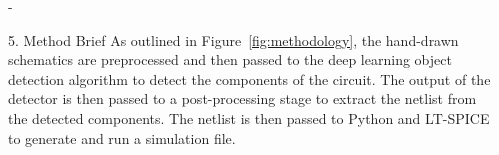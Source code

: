 \documentclass{beamer}
\begin{document}
\begin{frame}[t]
\begin{columns}[t]
\begin{column}{\colwidth}
      {\beamerblocknoheader
        \begin{alertblock}{}
          \centering
          \begin{column}{\colwidth-\sepwidth}
            {\beamerblockheader
              \RaggedRight

              \begin{block}{5. Method Brief}
                As outlined in Figure~\ref{fig:methodology}, the hand-drawn schematics are preprocessed
                and then passed to the deep learning object detection algorithm to detect the components
                of the circuit. The output of the detector is then passed to a post-processing stage to
                extract the netlist from the detected components. The netlist is then passed to Python
                and LT-SPICE to generate and run a simulation file.
              \end{block}
            }
          \end{column}
        \end{alertblock}
      }
    \end{column}

    \separatorcolumn

    \begin{column}{\colwidth}

      \setlength\tabcolsep{10pt}
      \renewcommand{\arraystretch}{1.5}


\end{column}
\end{columns}
\end{frame}
\end{document}
